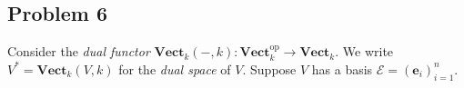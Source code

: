\documentclass{amsart}
\theoremstyle{remark}
\theoremstyle{definition}
\theoremstyle{definition}
\def\op{^{\text{op}}}
\def\Set{\mathbf{Set}}
\def\Vect{\mathbf{Vect}}
\begin{document}
\iffalse

\subsection{Problem 6}

Consider the arrow category $\Set^\to$.

\begin{enumerate}[(a)]
\item Prove that there are, up to isomorphism, two objects of the form $f:\underline{2}\to\underline{2}$.
\item Describe the isomorphism classes of objects of the form $f:\underline{3}\to\underline{3}$.
\item What pattern do you notice?
\end{enumerate}

\fi

\subsection{Problem 6}

Consider the \emph{dual functor} $\Vect_k(-,k):\Vect_k\op\to\Vect_k$. We write $V^*=\Vect_k(V,k)$ for the \emph{dual space} of $V$. Suppose $V$ has a basis $\mathcal{E}=(\mathbf{e}_i)_{i=1}^n$. 
\end{document}
